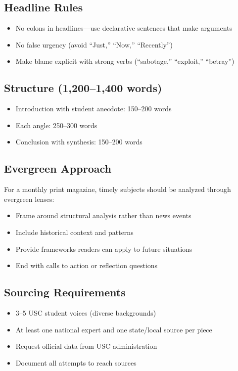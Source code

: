 \documentclass[11pt,letterpaper]{article}
\begin{document}
\subsection*{Headline Rules}
\begin{itemize}[noitemsep]
    \item No colons in headlines---use declarative sentences that make arguments
    \item No false urgency (avoid ``Just,'' ``Now,'' ``Recently'')
    \item Make blame explicit with strong verbs (``sabotage,'' ``exploit,'' ``betray'')
\end{itemize}

\subsection*{Structure (1,200--1,400 words)}
\begin{itemize}[noitemsep]
    \item Introduction with student anecdote: 150--200 words
    \item Each angle: 250--300 words
    \item Conclusion with synthesis: 150--200 words
\end{itemize}

\subsection*{Evergreen Approach}
For a monthly print magazine, timely subjects should be analyzed through evergreen lenses:
\begin{itemize}[noitemsep]
    \item Frame around structural analysis rather than news events
    \item Include historical context and patterns
    \item Provide frameworks readers can apply to future situations
    \item End with calls to action or reflection questions
\end{itemize}

\subsection*{Sourcing Requirements}
\begin{itemize}[noitemsep]
    \item 3--5 USC student voices (diverse backgrounds)
    \item At least one national expert and one state/local source per piece
    \item Request official data from USC administration
    \item Document all attempts to reach sources
\end{itemize}
\end{document}
